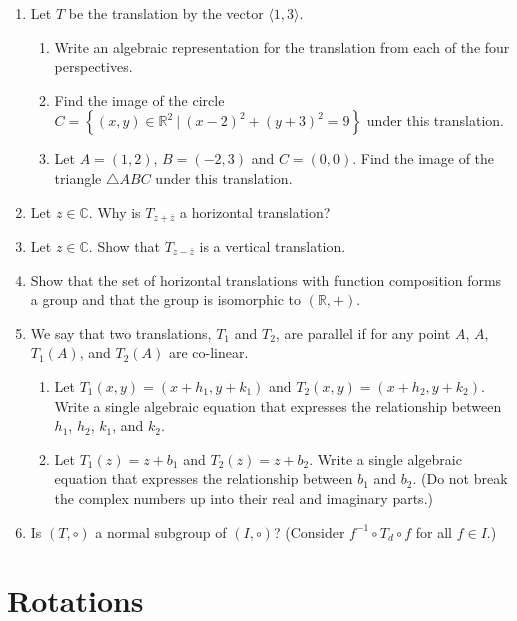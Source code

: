 \documentclass[
]{book}
\providecommand{\tightlist}{%
  \setlength{\itemsep}{0pt}\setlength{\parskip}{0pt}}
\theoremstyle{definition}
\theoremstyle{definition}
\theoremstyle{definition}
\theoremstyle{definition}
\theoremstyle{remark}
\begin{document}
\begin{enumerate}
\def\labelenumi{\arabic{enumi}.}
\item
  Let \(T\) be the translation by the vector \(\langle 1,3\rangle\).

  \begin{enumerate}
  \def\labelenumii{\alph{enumii}.}
  \tightlist
  \item
    Write an algebraic representation for the translation from each of the four perspectives.
  \item
    Find the image of the circle \(C=\left\{ (x,y)\in \mathbb{R}^2 \: \vert \: (x-2)^2+(y+3)^2 =9\right\}\) under this translation.
  \item
    Let \(A=(1,2)\), \(B=(-2,3)\) and \(C=(0,0)\). Find the image of the triangle \(\triangle ABC\) under this translation.
  \end{enumerate}
\item
  Let \(z\in \mathbb{C}\). Why is \(T_{z+\overline{z}}\) a horizontal translation?
\item
  Let \(z\in \mathbb{C}\). Show that \(T_{z-\overline{z}}\) is a vertical translation.
\item
  Show that the set of horizontal translations with function composition forms a group and that the group is isomorphic to \((\mathbb{R},+)\).
\item
  We say that two translations, \(T_1\) and \(T_2\), are parallel if for any point \(A\), \(A\), \(T_1(A)\), and \(T_2(A)\) are co-linear.

  \begin{enumerate}
  \def\labelenumii{\alph{enumii}.}
  \tightlist
  \item
    Let \(T_1(x,y)=(x+h_1,y+k_1)\) and \(T_2(x,y)=(x+h_2,y+k_2)\). Write a single algebraic equation that expresses the relationship between \(h_1\), \(h_2\), \(k_1\), and \(k_2\).
  \item
    Let \(T_1(z)=z+b_1\) and \(T_2(z)=z+b_2\). Write a single algebraic equation that expresses the relationship between \(b_1\) and \(b_2\). (Do not break the complex numbers up into their real and imaginary parts.)
  \end{enumerate}
\item
  Is \((T,\circ )\) a normal subgroup of \((I,\circ )\)? (Consider \(f^{-1} \circ T_d \circ f\) for all \(f\in I\).)
\end{enumerate}

\hypertarget{rotations}{%
\section{Rotations}\label{rotations}}
\end{document}
